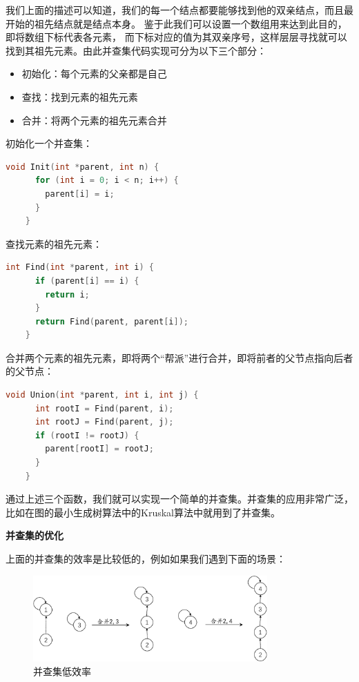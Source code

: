 \documentclass[lang=cn,newtx,10pt,scheme=chinese]{../elegantbook}
\begin{document}
我们上面的描述可以知道，我们的每一个结点都要能够找到他的双亲结点，而且最开始的祖先结点就是结点本身。
鉴于此我们可以设置一个数组用来达到此目的，即将数组下标代表各元素，
而下标对应的值为其双亲序号，这样层层寻找就可以找到其祖先元素。由此并查集代码实现可分为以下三个部分：

\begin{itemize}
  \item 初始化：每个元素的父亲都是自己
  \item 查找：找到元素的祖先元素
  \item 合并：将两个元素的祖先元素合并
  \end{itemize}

  初始化一个并查集：

  \begin{lstlisting}[language=C++, caption={并查集初始化}]
    void Init(int *parent, int n) {
      for (int i = 0; i < n; i++) {
        parent[i] = i;
      }
    }
  \end{lstlisting}

  查找元素的祖先元素：

  \begin{lstlisting}[language=C++, caption={查找元素的祖先元素}]
    int Find(int *parent, int i) {
      if (parent[i] == i) {
        return i;
      }
      return Find(parent, parent[i]);
    }

  \end{lstlisting}

  合并两个元素的祖先元素，即将两个“帮派”进行合并，即将前者的父节点指向后者的父节点：

  \begin{lstlisting}[language=C++, caption={合并两个元素的祖先元素}]
    void Union(int *parent, int i, int j) {
      int rootI = Find(parent, i);
      int rootJ = Find(parent, j);
      if (rootI != rootJ) {
        parent[rootI] = rootJ;
      }
    }
  \end{lstlisting}

  通过上述三个函数，我们就可以实现一个简单的并查集。并查集的应用非常广泛，比如在图的最小生成树算法中的Kruskal算法中就用到了并查集。

  \textbf{并查集的优化}

  上面的并查集的效率是比较低的，例如如果我们遇到下面的场景：

  \begin{figure}
    \centering
    \includegraphics[width=0.8\textwidth]{./figure/pdf/cropped/unionFindLow.pdf}
    \caption{并查集低效率}
    \label{fig:unionFind6}
  \end{figure}
\end{document}
